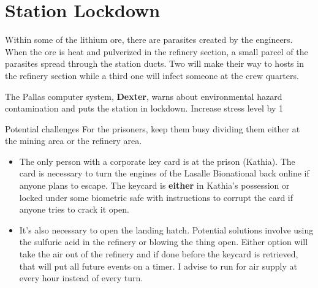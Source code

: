 \newsect

\section{Station Lockdown}



\begin{rpg-commentbox}{}
    
    Within some of the lithium ore, there are parasites created by the engineers. When the ore is heat and pulverized in the refinery section, a small parcel of the parasites spread through the station ducts. Two will make their way to hosts in the refinery section while a third one will infect someone at the crew quarters. 
    
    The Pallas computer system, \textbf{Dexter}, warns about environmental hazard contamination and puts the station in lockdown. Increase stress level by 1
\end{rpg-commentbox}    


\medskip
\begin{rpg-commentbox}{Potential challenges}
For the prisoners, keep them busy dividing them either at the mining area or the refinery area.

\begin{itemize}
    \item The only person with a corporate key card is at the prison (Kathia). The card is necessary to turn the engines of the Lasalle Bionational back online if anyone plans to escape. The keycard is \textbf{either} in Kathia's possession or locked under some biometric safe with instructions to corrupt the card if anyone tries to crack it open. 

    \item It's also necessary to open the landing hatch. Potential solutions involve using the sulfuric acid in the refinery or blowing the thing open. Either option will take the air out of the refinery and if done before the keycard is retrieved, that will put all future events on a timer. I advise to run for air supply at every hour instead of every turn.
\end{itemize}
\end{rpg-commentbox}



    


